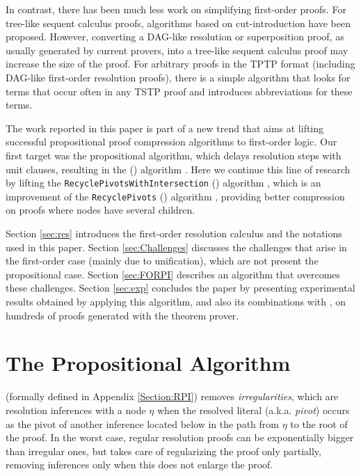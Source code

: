 \documentclass{llncs}
\begin{document}
In contrast, there has been much less work on simplifying first-order proofs. For tree-like sequent calculus proofs, algorithms based on cut-introduction \cite{BrunoLPAR,Hetzl} have been proposed. However, converting a DAG-like resolution or superposition proof, as usually generated by current provers, into a tree-like sequent calculus proof may increase the size of the proof. For arbitrary proofs in the TPTP \cite{TPTP} format (including DAG-like first-order resolution proofs), there is a simple algorithm \cite{LPARCzech} that looks for terms that occur often in any TSTP \cite{TPTP} proof and introduces abbreviations for these terms. 


The work reported in this paper is part of a new trend that aims at lifting successful propositional proof compression algorithms to first-order logic. Our first target was the propositional {\LowerUnits} algorithm, which delays resolution steps with unit clauses, resulting in the
{\SFOLowerUnits} 
({\GFOLU}) algorithm \cite{GFOLU}. Here we continue this line of research by lifting the 
\texttt{Recycle\-PivotsWithIntersection}
({\RPI}) algorithm \cite{LURPI}, which is an improvement of the \texttt{RecyclePivots} ({\RP}) algorithm \cite{RP08}, providing better compression on proofs where nodes have several children. 

Section \ref{sec:res} introduces the first-order resolution calculus and the notations used in this paper. Section \ref{sec:Challenges} discusses the challenges that arise in the first-order case (mainly due to unification), which are not present the propositional case. Section \ref{sec:FORPI} describes an algorithm that overcomes these challenges. Section \ref{sec:exp} concludes the paper by presenting experimental results obtained by applying this algorithm, and also its combinations with {\GFOLU}, on hundreds of proofs generated with the {\SPASS} theorem prover. 





\section{The Propositional Algorithm}

{\RPI} (formally defined in Appendix \ref{Section:RPI}) removes \emph{irregularities}, which are resolution inferences with a node $\eta$ when the resolved literal (a.k.a. \emph{pivot}) occurs as the pivot of another inference located below in the path from $\eta$ to the root of the proof. In the worst case, regular resolution proofs can be exponentially bigger than irregular ones, but {\RPI} takes care of regularizing the proof only partially, removing inferences only when this does not enlarge the proof.
\end{document}
